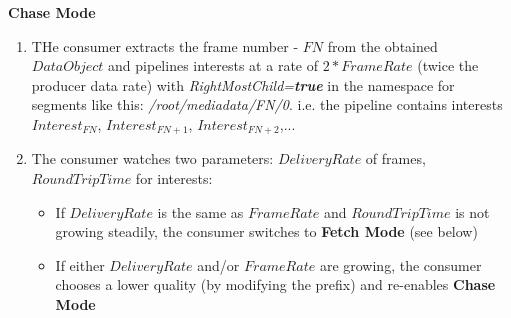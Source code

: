 \documentclass[12pt]{article}
\begin{document}
\textbf{Chase Mode}
\begin{enumerate}
\item THe consumer extracts the frame number - $FN$ from the obtained $DataObject$ and pipelines interests at a rate of $2*FrameRate$ (twice the producer data rate) with \textit{RightMostChild=\textbf{true}} in the namespace for segments like this: \textit{/root/mediadata/FN/0}. i.e. the pipeline contains interests $Interest_{FN}$, $Interest_{FN+1}$, $Interest_{FN+2}$,...

\item The consumer watches two parameters: $DeliveryRate$ of frames, $RoundTripTime$ for interests:
\begin{itemize}
\item If $DeliveryRate$ is the same as $FrameRate$  and $RoundTripTime$ is not growing steadily, the consumer switches to \textbf{Fetch Mode} (see below)
\item If either $DeliveryRate$ and/or $FrameRate$ are growing, the consumer chooses a lower quality (by modifying the prefix) and re-enables \textbf{Chase Mode}
\end{itemize}
\end{enumerate}
\end{document}
